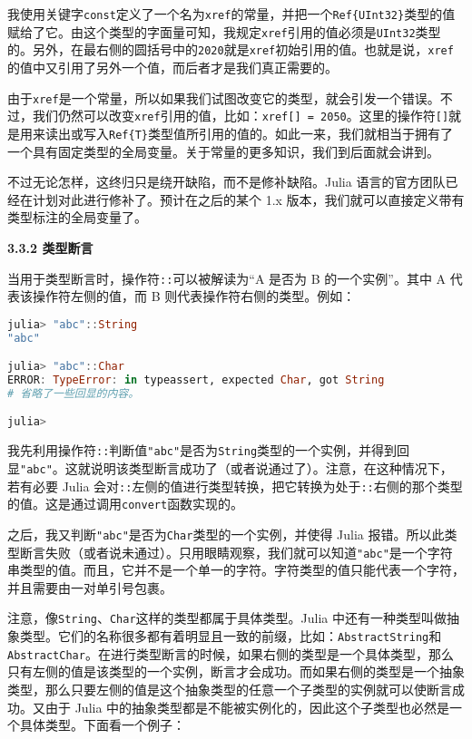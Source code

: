 我使用关键字\verb`const`定义了一个名为\verb`xref`的常量，并把一个\verb`Ref{UInt32}`类型的值赋给了它。由这个类型的字面量可知，我规定\verb`xref`引用的值必须是\verb`UInt32`类型的。另外，在最右侧的圆括号中的\verb`2020`就是\verb`xref`初始引用的值。也就是说，\verb`xref`的值中又引用了另外一个值，而后者才是我们真正需要的。

由于\verb`xref`是一个常量，所以如果我们试图改变它的类型，就会引发一个错误。不过，我们仍然可以改变\verb`xref`引用的值，比如：\verb`xref[] = 2050`。这里的操作符\verb`[]`就是用来读出或写入\verb`Ref{T}`类型值所引用的值的。如此一来，我们就相当于拥有了一个具有固定类型的全局变量。关于常量的更多知识，我们到后面就会讲到。

不过无论怎样，这终归只是绕开缺陷，而不是修补缺陷。Julia 语言的官方团队已经在计划对此进行修补了。预计在之后的某个 1.x 版本，我们就可以直接定义带有类型标注的全局变量了。

\textbf{3.3.2 类型断言}

当用于类型断言时，操作符\verb`::`可以被解读为“A 是否为 B 的一个实例”。其中 A 代表该操作符左侧的值，而 B 则代表操作符右侧的类型。例如：

\begin{lstlisting}[language=julia]
julia> "abc"::String
"abc"

julia> "abc"::Char
ERROR: TypeError: in typeassert, expected Char, got String
# 省略了一些回显的内容。

julia> 
\end{lstlisting}

我先利用操作符\verb`::`判断值\verb`"abc"`是否为\verb`String`类型的一个实例，并得到回显\verb`"abc"`。这就说明该类型断言成功了（或者说通过了）。注意，在这种情况下，若有必要 Julia 会对\verb`::`左侧的值进行类型转换，把它转换为处于\verb`::`右侧的那个类型的值。这是通过调用\verb`convert`函数实现的。

之后，我又判断\verb`"abc"`是否为\verb`Char`类型的一个实例，并使得 Julia 报错。所以此类型断言失败（或者说未通过）。只用眼睛观察，我们就可以知道\verb`"abc"`是一个字符串类型的值。而且，它并不是一个单一的字符。字符类型的值只能代表一个字符，并且需要由一对单引号包裹。

注意，像\verb`String`、\verb`Char`这样的类型都属于具体类型。Julia 中还有一种类型叫做抽象类型。它们的名称很多都有着明显且一致的前缀，比如：\verb`AbstractString`和\verb`AbstractChar`。在进行类型断言的时候，如果右侧的类型是一个具体类型，那么只有左侧的值是该类型的一个实例，断言才会成功。而如果右侧的类型是一个抽象类型，那么只要左侧的值是这个抽象类型的任意一个子类型的实例就可以使断言成功。又由于 Julia 中的抽象类型都是不能被实例化的，因此这个子类型也必然是一个具体类型。下面看一个例子：

